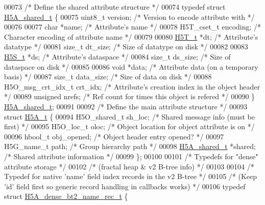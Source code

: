 \begin{DoxyCode}
00073 \textcolor{comment}{/* Define the shared attribute structure */}
00074 \textcolor{keyword}{typedef} \textcolor{keyword}{struct }\hyperlink{struct_h5_a__shared__t}{H5A\_shared\_t} \{
00075     uint8\_t     version;    \textcolor{comment}{/* Version to encode attribute with */}
00076 
00077     \textcolor{keywordtype}{char}        *name;      \textcolor{comment}{/* Attribute's name */}
00078     H5T\_cset\_t  encoding;   \textcolor{comment}{/* Character encoding of attribute name */}
00079 
00080     \hyperlink{struct_h5_t__t}{H5T\_t}       *dt;        \textcolor{comment}{/* Attribute's datatype */}
00081     \textcolor{keywordtype}{size\_t}      dt\_size;    \textcolor{comment}{/* Size of datatype on disk */}
00082 
00083     \hyperlink{struct_h5_s__t}{H5S\_t}       *ds;        \textcolor{comment}{/* Attribute's dataspace */}
00084     \textcolor{keywordtype}{size\_t}      ds\_size;    \textcolor{comment}{/* Size of dataspace on disk */}
00085 
00086     \textcolor{keywordtype}{void}        *data;      \textcolor{comment}{/* Attribute data (on a temporary basis) */}
00087     \textcolor{keywordtype}{size\_t}      data\_size;  \textcolor{comment}{/* Size of data on disk */}
00088     H5O\_msg\_crt\_idx\_t crt\_idx;  \textcolor{comment}{/* Attribute's creation index in the object header */}
00089     \textcolor{keywordtype}{unsigned}    nrefs;      \textcolor{comment}{/* Ref count for times this object is refered   */}
00090 \} \hyperlink{struct_h5_a__shared__t}{H5A\_shared\_t};
00091 
00092 \textcolor{comment}{/* Define the main attribute structure */}
00093 \textcolor{keyword}{struct }\hyperlink{struct_h5_a__t}{H5A\_t} \{
00094     H5O\_shared\_t sh\_loc;     \textcolor{comment}{/* Shared message info (must be first) */}
00095     H5O\_loc\_t    oloc;       \textcolor{comment}{/* Object location for object attribute is on */}
00096     hbool\_t      obj\_opened; \textcolor{comment}{/* Object header entry opened? */}
00097     H5G\_name\_t   path;       \textcolor{comment}{/* Group hierarchy path */}
00098     \hyperlink{struct_h5_a__shared__t}{H5A\_shared\_t} *shared;    \textcolor{comment}{/* Shared attribute information */}
00099 \};
00100 
00101 \textcolor{comment}{/* Typedefs for "dense" attribute storage */}
00102 \textcolor{comment}{/* (fractal heap & v2 B-tree info) */}
00103 
00104 \textcolor{comment}{/* Typedef for native 'name' field index records in the v2 B-tree */}
00105 \textcolor{comment}{/* (Keep 'id' field first so generic record handling in callbacks works) */}
00106 \textcolor{keyword}{typedef} \textcolor{keyword}{struct }\hyperlink{struct_h5_a__dense__bt2__name__rec__t}{H5A\_dense\_bt2\_name\_rec\_t} \{

\end{DoxyCode}
